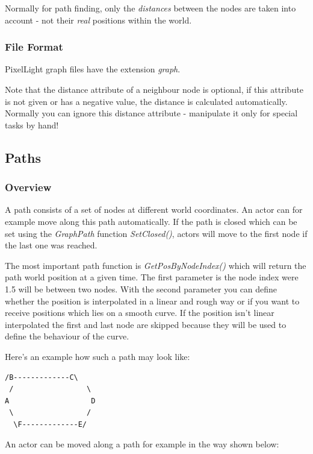 Normally for path finding, only the \emph{distances} between the nodes are taken into account - not their \emph{real} positions within the world.



\subsubsection{File Format}
PixelLight graph files have the extension \emph{graph}.

Note that the distance attribute of a neighbour node is optional, if this attribute is not given or has a negative value, the distance is calculated automatically. Normally you can ignore this distance attribute - manipulate it only for special tasks by hand!




\subsection{Paths}



\subsubsection{Overview}
A path consists of a set of nodes at different world coordinates. An actor can for example move along this path automatically. If the path is closed which can be set using the \emph{GraphPath} function \emph{SetClosed()}, actors will move to the first node if the last one was reached.

The most important path function is \emph{GetPosByNodeIndex()} which will return the path world position at a given time. The first parameter is the node index were 1.5 will be between two nodes. With the second parameter you can define whether the position is interpolated in a linear and rough way or if you want to receive positions which lies on a smooth curve. If the position isn't linear interpolated the first and last node are skipped because they will be used to define the behaviour of the curve.

Here's an example how such a path may look like:

\begin{lstlisting}[caption=Path example]
  /B-------------C\
 /                 \
A                   D
 \                 /
  \F-------------E/
\end{lstlisting}

An actor can be moved along a path for example in the way shown below:

